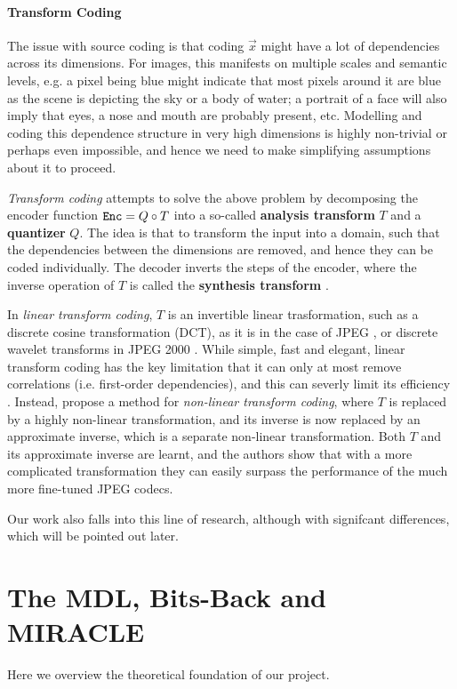 \paragraph{Transform Coding}
The issue with source coding is that coding $\vec{x}$ might have a lot of
dependencies across its dimensions. For images, this manifests on multiple
scales and semantic levels, e.g. a pixel being blue might indicate that most
pixels around it are blue as the scene is depicting the sky or a body of water;
a portrait of a face will also imply that eyes, a nose and mouth are probably
present, etc. Modelling and coding this dependence structure in very high
dimensions is highly non-trivial or perhaps even impossible, and hence we need
to make simplifying assumptions about it to proceed.
\par
\textit{Transform coding} attempts to solve the above problem by decomposing the
encoder function $\mathtt{Enc} = Q \circ T$ into a so-called \textbf{analysis transform}
$T$ and a \textbf{quantizer} $Q$. The idea is that to transform the input into a
domain, such that the dependencies between the dimensions are removed, and hence
they can be coded individually. The decoder inverts the steps of the encoder,
where the inverse operation of $T$ is called the \textbf{synthesis transform}
\cite{gupta2011modified}.
\par
In \textit{linear transform coding}, $T$ is an invertible linear trasformation,
such as a discrete cosine transformation (DCT), as it is in the case of JPEG
\cite{wallace1992jpeg}, or discrete wavelet transforms in JPEG 2000
\cite{rabbani2002overview}. While simple, fast and elegant, linear transform
coding has the key limitation that it can only at most remove correlations (i.e.
first-order dependencies), and this can severly limit its efficiency
\cite{balle2016endtrans}. Instead, \cite{balle2016endtrans} propose a method for
\textit{non-linear transform coding}, where $T$ is replaced by a highly
non-linear transformation, and its inverse is now replaced by an approximate
inverse, which is a separate non-linear transformation. Both $T$ and its
approximate inverse are learnt, and the authors show that with a more
complicated transformation they can easily surpass the performance of the much
more fine-tuned JPEG codecs.
\par
Our work also falls into this line of research, although with signifcant
differences, which will be pointed out later.
\section{The MDL, Bits-Back and MIRACLE}
\par
Here we overview the theoretical foundation of our project.
